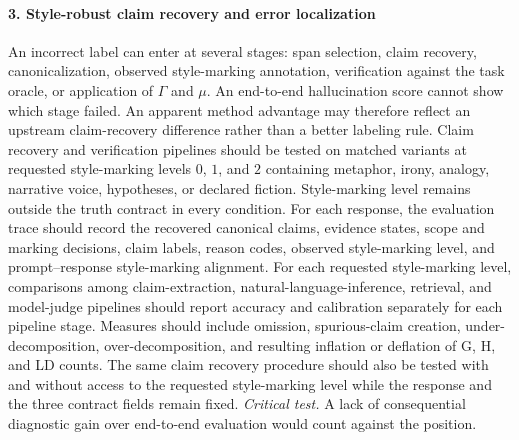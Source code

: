 \documentclass{clv2025}
\newcommand{\LD}{\textsc{LD}}
\newcommand{\Hall}{\textsc{H}}
\newcommand{\Grd}{\textsc{G}}
\begin{document}
\paragraph{3. Style-robust claim recovery and error localization}
An incorrect label can enter at several stages: span selection, claim recovery,
canonicalization, observed style-marking annotation, verification against the
task oracle, or application of $\Gamma$ and $\mu$. An end-to-end hallucination
score cannot show which stage failed. An apparent method advantage may
therefore reflect an upstream claim-recovery difference rather than a better
labeling rule.
Claim recovery and verification pipelines should be tested on matched variants
at requested style-marking levels $0$, $1$, and $2$ containing metaphor,
irony, analogy, narrative voice, hypotheses, or declared fiction.
Style-marking level remains outside the truth contract in every condition.
For each response, the evaluation trace should record the recovered canonical
claims, evidence states, scope and marking decisions, claim labels, reason
codes, observed style-marking level, and prompt--response style-marking
alignment. For each requested style-marking level, comparisons among
claim-extraction, natural-language-inference, retrieval, and model-judge
pipelines should report accuracy and calibration separately for each pipeline
stage.
Measures should include omission, spurious-claim creation,
under-decomposition, over-decomposition, and resulting inflation or deflation of
\Grd{}, \Hall{}, and \LD{} counts.
The same claim recovery procedure should also be tested with and without
access to the requested style-marking level while the response and the three
contract fields remain fixed.
\emph{Critical test.} A lack of consequential diagnostic gain over end-to-end
evaluation would count against the position.
\end{document}
